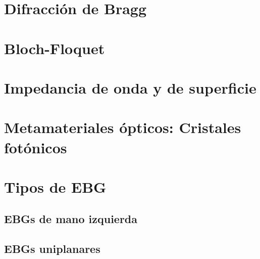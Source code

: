 \section{Difracción de Bragg}
\label{sec_bragg}
\lipsum
\section{Bloch-Floquet}
\label{sec_bloch}
\lipsum
\section{Impedancia de onda y de superficie}
\label{sec_imp_superficie}
\lipsum


\section{Metamateriales ópticos: Cristales fotónicos}
\label{sec_cristales_fotonicos}
\lipsum
\section{Tipos de EBG}
\label{sec_tipos_mtm}
\lipsum[1]
\subsection{EBGs de mano izquierda}
\label{subsec_ebg_izquierda}
\lipsum
\subsection{EBGs uniplanares}
\label{subsec_ebg_uniplanar}
\lipsum
